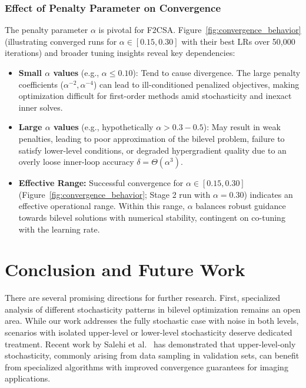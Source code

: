 \documentclass[letterpaper]{article} %
\newcommand{\1}{\mathbf{1}}
\begin{document}
\subsubsection{Effect of Penalty Parameter on Convergence}
The penalty parameter $\alpha$ is pivotal for F2CSA. Figure~\ref{fig:convergence_behavior} (illustrating converged runs for $\alpha \in [0.15, 0.30]$ with their best LRs over 50,000 iterations) and broader tuning insights reveal key dependencies:
\begin{itemize}[leftmargin=*,nosep]
    \item \textbf{Small $\alpha$ values} (e.g., $\alpha \leq 0.10$): Tend to cause divergence. The large penalty coefficients ($\alpha^{-2}, \alpha^{-4}$) can lead to ill-conditioned penalized objectives, making optimization difficult for first-order methods amid stochasticity and inexact inner solves.
    \item \textbf{Large $\alpha$ values} (e.g., hypothetically $\alpha > 0.3-0.5$): May result in weak penalties, leading to poor approximation of the bilevel problem, failure to satisfy lower-level conditions, or degraded hypergradient quality due to an overly loose inner-loop accuracy $\delta = \Theta(\alpha^3)$.
    \item \textbf{Effective Range:} Successful convergence for $\alpha \in [0.15, 0.30]$ (Figure~\ref{fig:convergence_behavior}; Stage 2 run with $\alpha=0.30$) indicates an effective operational range. Within this range, $\alpha$ balances robust guidance towards bilevel solutions with numerical stability, contingent on co-tuning with the learning rate.
\end{itemize}
\section{Conclusion and Future Work}

There are several promising directions for further research. First, specialized analysis of different stochasticity patterns in bilevel optimization remains an open area. While our work addresses the fully stochastic case with noise in both levels, scenarios with isolated upper-level or lower-level stochasticity deserve dedicated treatment. Recent work by Salehi et al.~\cite{salehi2025} has demonstrated that upper-level-only stochasticity, commonly arising from data sampling in validation sets, can benefit from specialized algorithms with improved convergence guarantees for imaging applications.
\end{document}
